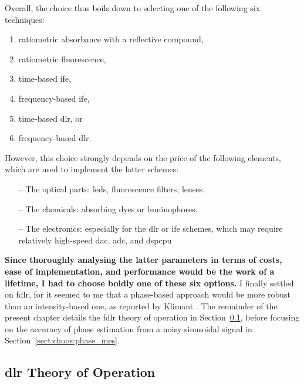 Overall, the choice thus boils down to selecting one of the following six techniques:
\begin{multicols}{2}
\begin{enumerate}
	\item ratiometric absorbance with a reflective compound,
	\item ratiometric fluorescence,
	\item time-based \gls{ife},
	\item frequency-based \gls{ife},
	\item time-based \gls{dlr}, or
	\item frequency-based \gls{dlr}.
\end{enumerate}
\end{multicols}
However, this choice strongly depends on the price of the following elements, which are used to implement the latter schemes:
\begin{itemize}
	\item[--] The optical parts: \glspl{led}, fluorescence filters, lenses.
	\item[--] The chemicals: absorbing dyes or luminophores.
	\item[--] The electronics: especially for the \gls{dlr} or \gls{ife} schemes, which may require relatively high-speed \gls{dac}, \gls{adc}, and \gls{dspcpu}
\end{itemize}

\textbf{Since thoroughly analysing the latter parameters in terms of costs, ease of implementation, and performance would be the work of a lifetime, I had to choose boldly one of these six options.} I finally settled on \gls{fdlr}, for it seemed to me that a phase-based approach would be more robust than an intensity-based one, as reported by Klimant \etal{}\cite{klimant2001_pap}. The remainder of the present chapter details the \gls{fdlr} theory of operation in Section~\ref{sect:choos:dye_based:dlr_theory}, before focusing on the accuracy of phase estimation from a noisy sinusoidal signal in Section~\ref{sect:choos:phase_mes}.

\subsection{\texorpdfstring{\gls{dlr}}{DLR} Theory of Operation}\label{sect:choos:dye_based:dlr_theory}

